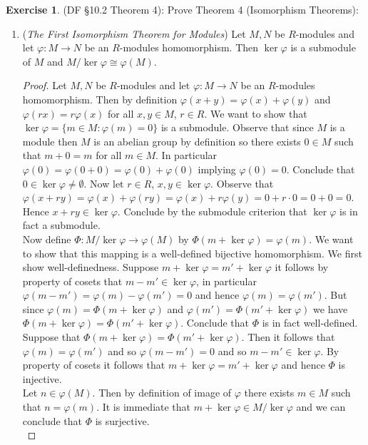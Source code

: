\documentclass[8pt]{amsart}
\theoremstyle{plain}%
\theoremstyle{definition}
\newtheorem*{exercise}{Exercise}%
\theoremstyle{remark}
\numberwithin{equation}{section}
\begin{document}
\begin{exercise}
(DF \S10.2 Theorem 4): Prove Theorem 4 (Isomorphism Theorems):
	\begin{enumerate}
		\item (\textit{The First Isomorphism Theorem for Modules}) Let $M, N$ be $R$-modules and let $\varphi : M \to N$ be an $R$-modules homomorphism. Then $\ker \varphi$ is a submodule of $M$ and $M/\ker \varphi \cong \varphi(M)$.
			\begin{proof}
				Let $M, N$ be $R$-modules and let $\varphi : M \to N$ be an $R$-modules homomorphism. Then by definition $\varphi(x + y) = \varphi(x) + \varphi(y)$ and $\varphi(rx) = r\varphi(x)$ for all $x, y \in M$, $r \in R$. We want to show that $\ker \varphi = \{m \in M : \varphi(m) = 0\}$ is a submodule. Observe that since $M$ is a module then $M$ is an abelian group by definition so there exists $0 \in M$ such that $m + 0 = m$ for all $m \in M$. In particular $\varphi(0) = \varphi(0 + 0) = \varphi(0) + \varphi(0)$ implying $\varphi(0) = 0$. Conclude that $0 \in \ker \varphi \neq \emptyset$. Now let $r \in R$, $x, y \in \ker \varphi$. Observe that $\varphi(x + ry) = \varphi(x) + \varphi(ry) = \varphi(x) + r\varphi(y) = 0 + r \cdot 0 = 0 + 0 = 0$. Hence $x + ry \in \ker \varphi$. Conclude by the submodule criterion that $\ker \varphi$ is in fact a submodule.\\

				Now define $\Phi : M/\ker \varphi \to \varphi(M)$ by $\Phi(m + \ker \varphi) = \varphi(m)$. We want to show that this mapping is a well-defined bijective homomorphism. We first show well-definedness. Suppose $m + \ker \varphi = m' + \ker \varphi$ it follows by property of cosets that $m - m' \in \ker \varphi$, in particular $\varphi(m - m') = \varphi(m) - \varphi(m') = 0$ and hence $\varphi(m) = \varphi(m')$. But since $\varphi(m) = \Phi(m + \ker \varphi)$ and $\varphi(m') = \Phi(m' + \ker\varphi)$ we have $\Phi(m + \ker\varphi) = \Phi(m' + \ker\varphi)$. Conclude that $\Phi$ is in fact well-defined.\\

				Suppose that $\Phi(m + \ker\varphi) = \Phi(m' + \ker\varphi)$. Then it follows that $\varphi(m) = \varphi(m')$ and so $\varphi(m - m') = 0$ and so $m - m' \in \ker\varphi$. By property of cosets it follows that $m + \ker\varphi = m' + \ker\varphi$ and hence $\Phi$ is injective.\\

				Let $n \in \varphi(M)$. Then by definition of image of $\varphi$ there exists $m \in M$ such that $n = \varphi(m)$. It is immediate that $m + \ker\varphi \in M/\ker\varphi$ and we can conclude that $\Phi$ is surjective.\\


\end{proof}
\end{enumerate}
\end{exercise}
\end{document}

